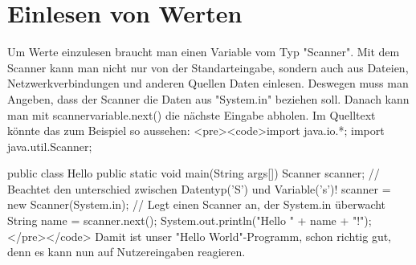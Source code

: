 \section {Einlesen von Werten}
Um Werte einzulesen braucht man einen Variable vom Typ "Scanner". Mit dem Scanner kann man nicht nur von der Standarteingabe, sondern auch aus Dateien, Netzwerkverbindungen und anderen Quellen Daten einlesen. 
Deswegen muss man Angeben, dass der Scanner die Daten aus "System.in" beziehen soll.
Danach kann man mit scannervariable.next() die nächste Eingabe abholen. Im Quelltext könnte das zum Beispiel so aussehen:
<pre><code>import java.io.*;
import java.util.Scanner;

public class Hello {
	public static void main(String args[]) {
		Scanner scanner;	// Beachtet den unterschied zwischen Datentyp('S') und Variable('s')!
		scanner = new Scanner(System.in); // Legt einen Scanner an, der System.in überwacht
		String name = scanner.next();
		System.out.println("Hello " + name + "!");
	}
}</pre></code>
Damit ist unser "Hello World"-Programm, schon richtig gut, denn es kann nun auf Nutzereingaben reagieren.

